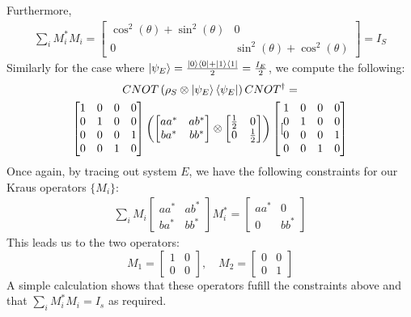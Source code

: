 \documentclass[12pt]{article}%
\begin{document}
  Furthermore,
  \begin{gather*}
    \sum_i M_i^* M_i = \left[\begin{matrix}
        \cos^2(\theta) + \sin^2(\theta) & 0 \\
        0 & \sin^2(\theta) + \cos^2(\theta)
      \end{matrix} \right] = I_S
  \end{gather*} \newline
Similarly for the case where $\ket{\psi_E} = \frac{\ket{0}\bra{0} + \ket{1}\bra{1}}{2} = \frac{I_E}{2}$, we compute the following:
\begin{gather*}
  CNOT\left(\rho_S \otimes \ket{\psi_E}\bra{\psi_E} \right)CNOT^{\dagger} = \\
  \left[\begin{matrix}
    1 & 0 & 0 & 0 \\
    0 & 1 & 0 & 0 \\
    0 & 0 & 0 & 1 \\
    0 & 0 & 1 & 0 \\
  \end{matrix}\right] \left(
  \left[
  \begin{matrix}
    aa^* & ab^* \\
    ba^* & bb^*
  \end{matrix}
  \right]
  \otimes
  \left[
  \begin{matrix}
    \frac{1}{2} & 0 \\
    0 & \frac{1}{2}
  \end{matrix}
  \right]
  \right)
  \left[
  [\begin{matrix}
    1 & 0 & 0 & 0 \\
    0 & 1 & 0 & 0 \\
    0 & 0 & 0 & 1 \\
    0 & 0 & 1 & 0 \\
  \end{matrix}
  \right]
\end{gather*}
Once again, by tracing out system $E$, we have the following constraints for our Kraus operators $\{M_i\}$:
\begin{gather*}
  \sum_i M_i
  \left[
  \begin{matrix}
    aa^* & ab^* \\
    ba^* & bb^*
  \end{matrix}
  \right] M_i^* = \left[
  \begin{matrix}
    aa^* & 0\\
    0 & bb^*
  \end{matrix}
  \right]
\end{gather*}
This leads us to the two operators:
$$M_1 = \left[
\begin{matrix}
  1 & 0 \\
  0 & 0
\end{matrix}
\right], \quad M_2 = \left[
\begin{matrix}
  0 & 0 \\
  0 & 1
\end{matrix}
\right] $$
A simple calculation shows that these operators fufill the constraints above and that $\sum_i M_i^*M_i = I_s$ as required.
\end{document}

